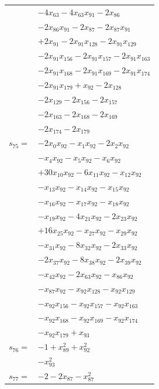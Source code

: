 \begin{longtable}{@{}r@{\;}l@{}}
 & \(\displaystyle -4x_{63} -4x_{63}x_{91} -2x_{86}\) \\
 & \(\displaystyle -2x_{86}x_{91} -2x_{87} -2x_{87}x_{91}\) \\
 & \(\displaystyle +2x_{91} -2x_{91}x_{128} -2x_{91}x_{129}\) \\
 & \(\displaystyle -2x_{91}x_{156} -2x_{91}x_{157} -2x_{91}x_{163}\) \\
 & \(\displaystyle -2x_{91}x_{168} -2x_{91}x_{169} -2x_{91}x_{174}\) \\
 & \(\displaystyle -2x_{91}x_{179} +x_{92} -2x_{128}\) \\
 & \(\displaystyle -2x_{129} -2x_{156} -2x_{157}\) \\
 & \(\displaystyle -2x_{163} -2x_{168} -2x_{169}\) \\
 & \(\displaystyle -2x_{174} -2x_{179}\) \\[3pt]
\(s_{75}=\) & \(\displaystyle -2x_{0}x_{92} -x_{1}x_{92} -2x_{2}x_{92}\) \\
 & \(\displaystyle -x_{4}x_{92} -x_{5}x_{92} -x_{6}x_{92}\) \\
 & \(\displaystyle +30x_{10}x_{92} -6x_{11}x_{92} -x_{12}x_{92}\) \\
 & \(\displaystyle -x_{13}x_{92} -x_{14}x_{92} -x_{15}x_{92}\) \\
 & \(\displaystyle -x_{16}x_{92} -x_{17}x_{92} -x_{18}x_{92}\) \\
 & \(\displaystyle -x_{19}x_{92} -4x_{21}x_{92} -2x_{23}x_{92}\) \\
 & \(\displaystyle +16x_{25}x_{92} -x_{27}x_{92} -x_{29}x_{92}\) \\
 & \(\displaystyle -x_{31}x_{92} -8x_{32}x_{92} -2x_{33}x_{92}\) \\
 & \(\displaystyle -2x_{37}x_{92} -8x_{38}x_{92} -2x_{39}x_{92}\) \\
 & \(\displaystyle -x_{42}x_{92} -2x_{63}x_{92} -x_{86}x_{92}\) \\
 & \(\displaystyle -x_{87}x_{92} -x_{92}x_{128} -x_{92}x_{129}\) \\
 & \(\displaystyle -x_{92}x_{156} -x_{92}x_{157} -x_{92}x_{163}\) \\
 & \(\displaystyle -x_{92}x_{168} -x_{92}x_{169} -x_{92}x_{174}\) \\
 & \(\displaystyle -x_{92}x_{179} +x_{93}\) \\[3pt]
\(s_{76}=\) & \(\displaystyle -1 +x_{89}^{2} +x_{92}^{2}\) \\
 & \(\displaystyle -x_{93}^{2}\) \\[3pt]
\(s_{77}=\) & \(\displaystyle -2 -2x_{87} -x_{87}^{2}\) \\

\end{longtable}
